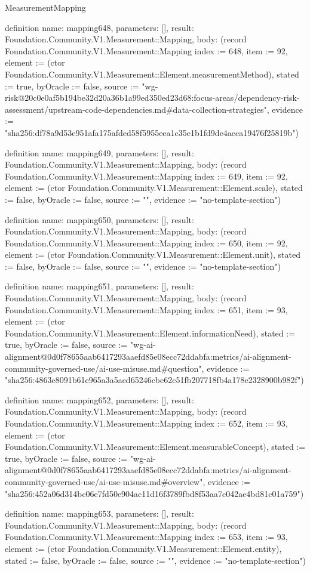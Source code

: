 \begin{lexlean}{MeasurementMapping}
\begin{semanticmodule}
definition{
  name: mapping648,
  parameters: [],
  result: Foundation.Community.V1.Measurement::Mapping,
  body: (record Foundation.Community.V1.Measurement::Mapping {index := 648, item := 92, element := (ctor Foundation.Community.V1.Measurement::Element.measurementMethod), stated := true, byOracle := false, source := "wg-risk@20c0e0af5b194be32d20a36b1a99ed350ed23d68:focus-areas/dependency-risk-assessment/upstream-code-dependencies.md#data-collection-strategies", evidence := "sha256:df78a9d53e951afa175afded58f5955eea1c35e1b1fd9de4aeca19476f25819b"})
}

definition{
  name: mapping649,
  parameters: [],
  result: Foundation.Community.V1.Measurement::Mapping,
  body: (record Foundation.Community.V1.Measurement::Mapping {index := 649, item := 92, element := (ctor Foundation.Community.V1.Measurement::Element.scale), stated := false, byOracle := false, source := "", evidence := "no-template-section"})
}

definition{
  name: mapping650,
  parameters: [],
  result: Foundation.Community.V1.Measurement::Mapping,
  body: (record Foundation.Community.V1.Measurement::Mapping {index := 650, item := 92, element := (ctor Foundation.Community.V1.Measurement::Element.unit), stated := false, byOracle := false, source := "", evidence := "no-template-section"})
}

definition{
  name: mapping651,
  parameters: [],
  result: Foundation.Community.V1.Measurement::Mapping,
  body: (record Foundation.Community.V1.Measurement::Mapping {index := 651, item := 93, element := (ctor Foundation.Community.V1.Measurement::Element.informationNeed), stated := true, byOracle := false, source := "wg-ai-alignment@0d0f78655aab6417293aaefd85e08ecc72ddabfa:metrics/ai-alignment-community-governed-use/ai-use-misuse.md#question", evidence := "sha256:4863e8091b61e965a3a5aed65246cbe62c51fb207718fb4a178e2328900b982f"})
}

definition{
  name: mapping652,
  parameters: [],
  result: Foundation.Community.V1.Measurement::Mapping,
  body: (record Foundation.Community.V1.Measurement::Mapping {index := 652, item := 93, element := (ctor Foundation.Community.V1.Measurement::Element.measurableConcept), stated := true, byOracle := false, source := "wg-ai-alignment@0d0f78655aab6417293aaefd85e08ecc72ddabfa:metrics/ai-alignment-community-governed-use/ai-use-misuse.md#overview", evidence := "sha256:452a06d314bc06e7fd50e904ac11d16f3789fbd8f53aa7c042ae4bd81c01a759"})
}

definition{
  name: mapping653,
  parameters: [],
  result: Foundation.Community.V1.Measurement::Mapping,
  body: (record Foundation.Community.V1.Measurement::Mapping {index := 653, item := 93, element := (ctor Foundation.Community.V1.Measurement::Element.entity), stated := false, byOracle := false, source := "", evidence := "no-template-section"})
}


\end{semanticmodule}
\end{lexlean}

